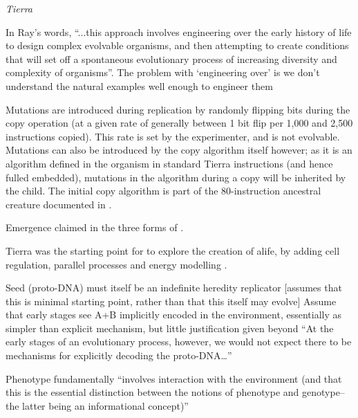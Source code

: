\begin{NOTES}
\emph{Tierra} \parencite{Ray1991}

In Ray's words, ``...this approach involves engineering over the early history of life to design complex evolvable organisms, and then attempting to create conditions that will set off a spontaneous evolutionary process of increasing diversity and complexity of organisms''\parencite{Taylor2001}. The problem with `engineering over' is we don't understand the natural examples well enough to engineer them \parencite{Taylor2001}

Mutations are introduced during replication by randomly flipping bits during the copy operation (at a given rate of generally between 1 bit flip per 1,000 and 2,500 instructions copied). This rate is set by the experimenter, and is not evolvable. Mutations can also be introduced by the copy algorithm itself however; as it is an algorithm defined in the organism in standard Tierra instructions (and hence fulled embedded), mutations in the algorithm during a copy will be inherited by the child. The initial copy algorithm is part of the 80-instruction ancestral creature documented in \cite[app.C]{Ray1991}.

Emergence claimed in the three forms of \cite{Cariani1991}.

Tierra was the starting point for \cite{Taylor2001, Taylor:1999sc} to explore the creation of \gls{alife}, by adding cell regulation, parallel processes and energy modelling \cite[p.4]{Taylor:1999sc}.

Seed (proto-DNA) must itself be an indefinite heredity replicator {[}assumes that this is minimal starting point, rather than that this itself may evolve{]} \parencite{Taylor2001}
Assume that early stages see A+B implicitly encoded in the environment, essentially as simpler than explicit mechanism, but little justification given beyond ``At the early stages of an evolutionary process, however, we would not expect there to be mechanisms for explicitly decoding the proto-DNA\ldots{}'' \parencite{Taylor2001}

Phenotype fundamentally ``involves interaction with the environment (and that this is the essential distinction between the notions of phenotype and genotype--the latter being an informational concept)'' \parencite{Taylor2001}


\end{NOTES}
